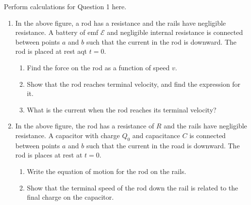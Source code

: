 \documentclass{../../oss-apphys}
\begin{document}
\newpage
Perform calculations for Question 1 here.
\newpage

\begin{center}
\end{center}

\begin{enumerate}[leftmargin=18pt,resume]
\item In the above figure, a rod has a resistance and the rails have negligible
  resistance. A battery of emf $\mathcal{E}$ and negligible internal resistance
  is connected between points $a$ and $b$ such that the current in the rod is
  downward. The rod is placed at rest aqt $t=0$.
  \begin{enumerate}[noitemsep]
  \item Find the force on the rod as a function of speed $v$.
  \item Show that the rod reaches terminal velocity, and find the expression for
    it.
  \item What is the current when the rod reaches its terminal velocity?
  \end{enumerate}
  \vspace{2in}
  
\item In the above figure, the rod has a resistance of $R$ and the rails have
  negligible resistance. A capacitor with charge $Q_0$ and capacitance $C$ is
  connected between points $a$ and $b$ such that the current in the road is
  downward. The rod is places at rest at $t=0$.
  \begin{enumerate}[noitemsep]
  \item Write the equation of motion for the rod on the rails.
  \item Show that the terminal speed of the rod down the rail is related to the
    final charge on the capacitor.
  \end{enumerate}
\end{enumerate}
\newpage
\end{document}
